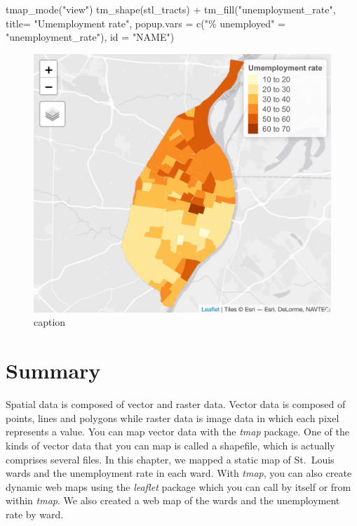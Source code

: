\documentclass[
  krantz2]{krantz}
\makeatletter
\newenvironment{Shaded}{\begin{snugshade}}{\end{snugshade}}
\newcommand{\AttributeTok}[1]{\textcolor[rgb]{0.61,0.61,0.61}{#1}}
\newcommand{\FunctionTok}[1]{\textcolor[rgb]{0,0,0}{#1}}
\newcommand{\NormalTok}[1]{#1}
\newcommand{\OtherTok}[1]{\textcolor[rgb]{0.37,0.37,0.37}{#1}}
\newcommand{\SpecialCharTok}[1]{\textcolor[rgb]{0,0,0}{#1}}
\newcommand{\StringTok}[1]{\textcolor[rgb]{0.5,0.5,0.5}{#1}}
\newenvironment{kframe}{%
\medskip{}
\setlength{\fboxsep}{.8em}
 \def\at@end@of@kframe{}%
 \ifinner\ifhmode%
  \def\at@end@of@kframe{\end{minipage}}%
  \begin{minipage}{\columnwidth}%
 \fi\fi%
 \def\FrameCommand##1{\hskip\@totalleftmargin \hskip-\fboxsep
 \colorbox{shadecolor}{##1}\hskip-\fboxsep
     \hskip-\linewidth \hskip-\@totalleftmargin \hskip\columnwidth}%
 \MakeFramed {\advance\hsize-\width
   \@totalleftmargin\z@ \linewidth\hsize
   \@setminipage}}%
 {\par\unskip\endMakeFramed%
 \at@end@of@kframe}
\renewenvironment{Shaded}{\begin{kframe}}{\end{kframe}}
\makeatother
\begin{document}
\begin{Shaded}
\begin{Highlighting}[]
\FunctionTok{tmap\_mode}\NormalTok{(}\StringTok{"view"}\NormalTok{)}
\FunctionTok{tm\_shape}\NormalTok{(stl\_tracts) }\SpecialCharTok{+}
  \FunctionTok{tm\_fill}\NormalTok{(}\StringTok{"unemployment\_rate"}\NormalTok{, }\AttributeTok{title=} \StringTok{"Umemployment rate"}\NormalTok{,}
          \AttributeTok{popup.vars =} \FunctionTok{c}\NormalTok{(}\StringTok{"\% unemployed"} \OtherTok{=} \StringTok{"unemployment\_rate"}\NormalTok{), }
          \AttributeTok{id =} \StringTok{"NAME"}\NormalTok{)}
\end{Highlighting}
\end{Shaded}

\begin{figure}
\centering
\includegraphics{tmap-images/code-8.png}
\caption{caption}
\end{figure}

\hypertarget{tmap-summary}{%
\section{Summary}\label{tmap-summary}}

Spatial data is composed of vector and raster data. Vector data is composed of points, lines and polygons while raster data is image data in which each pixel represents a value. You can map vector data with the \emph{tmap} package. One of the kinds of vector data that you can map is called a shapefile, which is actually comprises several files. In this chapter, we mapped a static map of St.~Louis wards and the unemployment rate in each ward. With \emph{tmap}, you can also create dynamic web maps using the \emph{leaflet} package which you can call by itself or from within \emph{tmap}. We also created a web map of the wards and the unemployment rate by ward.
\end{document}
